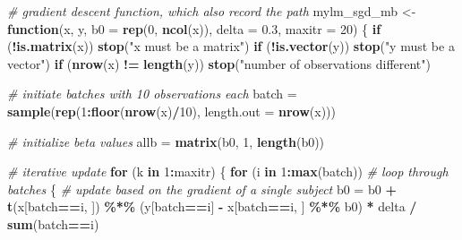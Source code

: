 \documentclass[
]{book}
\newenvironment{Shaded}{\begin{snugshade}}{\end{snugshade}}
\newcommand{\AttributeTok}[1]{\textcolor[rgb]{0.13,0.29,0.53}{#1}}
\newcommand{\CommentTok}[1]{\textcolor[rgb]{0.56,0.35,0.01}{\textit{#1}}}
\newcommand{\ControlFlowTok}[1]{\textcolor[rgb]{0.13,0.29,0.53}{\textbf{#1}}}
\newcommand{\DecValTok}[1]{\textcolor[rgb]{0.00,0.00,0.81}{#1}}
\newcommand{\FloatTok}[1]{\textcolor[rgb]{0.00,0.00,0.81}{#1}}
\newcommand{\FunctionTok}[1]{\textcolor[rgb]{0.13,0.29,0.53}{\textbf{#1}}}
\newcommand{\NormalTok}[1]{#1}
\newcommand{\OtherTok}[1]{\textcolor[rgb]{0.56,0.35,0.01}{#1}}
\newcommand{\SpecialCharTok}[1]{\textcolor[rgb]{0.81,0.36,0.00}{\textbf{#1}}}
\newcommand{\StringTok}[1]{\textcolor[rgb]{0.31,0.60,0.02}{#1}}
\theoremstyle{definition}
\theoremstyle{definition}
\theoremstyle{definition}
\theoremstyle{definition}
\theoremstyle{remark}
\begin{document}
\begin{Shaded}
\begin{Highlighting}[]
  \CommentTok{\# gradient descent function, which also record the path}
\NormalTok{  mylm\_sgd\_mb }\OtherTok{\textless{}{-}} \ControlFlowTok{function}\NormalTok{(x, y, }\AttributeTok{b0 =} \FunctionTok{rep}\NormalTok{(}\DecValTok{0}\NormalTok{, }\FunctionTok{ncol}\NormalTok{(x)), }\AttributeTok{delta =} \FloatTok{0.3}\NormalTok{, }\AttributeTok{maxitr =} \DecValTok{20}\NormalTok{)}
\NormalTok{  \{}
    \ControlFlowTok{if}\NormalTok{ (}\SpecialCharTok{!}\FunctionTok{is.matrix}\NormalTok{(x)) }\FunctionTok{stop}\NormalTok{(}\StringTok{"x must be a matrix"}\NormalTok{)}
    \ControlFlowTok{if}\NormalTok{ (}\SpecialCharTok{!}\FunctionTok{is.vector}\NormalTok{(y)) }\FunctionTok{stop}\NormalTok{(}\StringTok{"y must be a vector"}\NormalTok{)}
    \ControlFlowTok{if}\NormalTok{ (}\FunctionTok{nrow}\NormalTok{(x) }\SpecialCharTok{!=} \FunctionTok{length}\NormalTok{(y)) }\FunctionTok{stop}\NormalTok{(}\StringTok{"number of observations different"}\NormalTok{)}
    
    \CommentTok{\# initiate batches with 10 observations each}
\NormalTok{    batch }\OtherTok{=} \FunctionTok{sample}\NormalTok{(}\FunctionTok{rep}\NormalTok{(}\DecValTok{1}\SpecialCharTok{:}\FunctionTok{floor}\NormalTok{(}\FunctionTok{nrow}\NormalTok{(x)}\SpecialCharTok{/}\DecValTok{10}\NormalTok{), }\AttributeTok{length.out =} \FunctionTok{nrow}\NormalTok{(x)))}
  
    \CommentTok{\# initialize beta values}
\NormalTok{    allb }\OtherTok{=} \FunctionTok{matrix}\NormalTok{(b0, }\DecValTok{1}\NormalTok{, }\FunctionTok{length}\NormalTok{(b0))}
    
    \CommentTok{\# iterative update}
    \ControlFlowTok{for}\NormalTok{ (k }\ControlFlowTok{in} \DecValTok{1}\SpecialCharTok{:}\NormalTok{maxitr)}
\NormalTok{    \{}
      \ControlFlowTok{for}\NormalTok{ (i }\ControlFlowTok{in} \DecValTok{1}\SpecialCharTok{:}\FunctionTok{max}\NormalTok{(batch)) }\CommentTok{\# loop through batches}
\NormalTok{      \{}
        \CommentTok{\# update based on the gradient of a single subject}
\NormalTok{        b0 }\OtherTok{=}\NormalTok{ b0 }\SpecialCharTok{+} \FunctionTok{t}\NormalTok{(x[batch}\SpecialCharTok{==}\NormalTok{i, ]) }\SpecialCharTok{\%*\%}\NormalTok{ (y[batch}\SpecialCharTok{==}\NormalTok{i] }\SpecialCharTok{{-}}\NormalTok{ x[batch}\SpecialCharTok{==}\NormalTok{i, ] }\SpecialCharTok{\%*\%}\NormalTok{ b0) }\SpecialCharTok{*} 
\NormalTok{          delta }\SpecialCharTok{/} \FunctionTok{sum}\NormalTok{(batch}\SpecialCharTok{==}\NormalTok{i)}
        

\end{Highlighting}
\end{Shaded}
\end{document}
